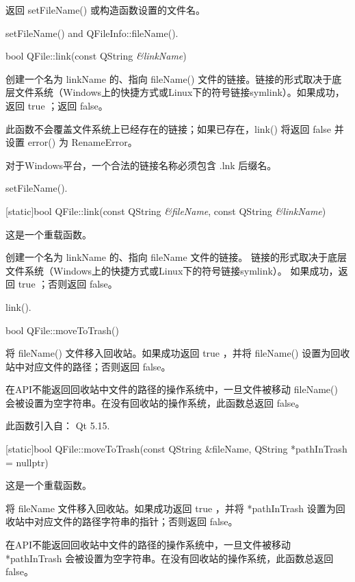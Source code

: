 返回 setFileName() 或构造函数设置的文件名。


\begin{seeAlso}
setFileName() and QFileInfo::fileName().
\end{seeAlso} 

bool QFile::link(const QString \emph{\&linkName})

创建一个名为 linkName 的、指向 fileName() 文件的链接。链接的形式取决于底层文件系统（Windows上的快捷方式或Linux下的符号链接symlink）。如果成功，返回 true ；返回 false。

此函数不会覆盖文件系统上已经存在的链接；如果已存在，link() 将返回 false 并设置 error() 为 RenameError。


\begin{notice}
对于Windows平台，一个合法的链接名称必须包含 .lnk 后缀名。
\end{notice} 


\begin{seeAlso}
setFileName().
\end{seeAlso} 

[static]bool QFile::link(const QString \emph{\&fileName}, const QString \emph{\&linkName})

这是一个重载函数。

创建一个名为 linkName 的、指向 fileName 文件的链接。
链接的形式取决于底层文件系统（Windows上的快捷方式或Linux下的符号链接symlink）。
如果成功，返回 true ；否则返回 false。

\begin{seeAlso}
link().
\end{seeAlso} 

bool QFile::moveToTrash()

将 fileName() 文件移入回收站。如果成功返回 true ，并将 fileName() 设置为回收站中对应文件的路径；否则返回 false。
 

\begin{notice}
在API不能返回回收站中文件的路径的操作系统中，一旦文件被移动 fileName() 会被设置为空字符串。在没有回收站的操作系统，此函数总返回 false。
\end{notice} 

此函数引入自： Qt 5.15.

[static]bool QFile::moveToTrash(const QString \&fileName, QString *pathInTrash = nullptr)

这是一个重载函数。

将 fileName 文件移入回收站。如果成功返回 true ，并将 *pathInTrash 设置为回收站中对应文件的路径字符串的指针；否则返回 false。

\begin{notice}
在API不能返回回收站中文件的路径的操作系统中，一旦文件被移动 *pathInTrash 会被设置为空字符串。在没有回收站的操作系统，此函数总返回 false。
\end{notice} 


